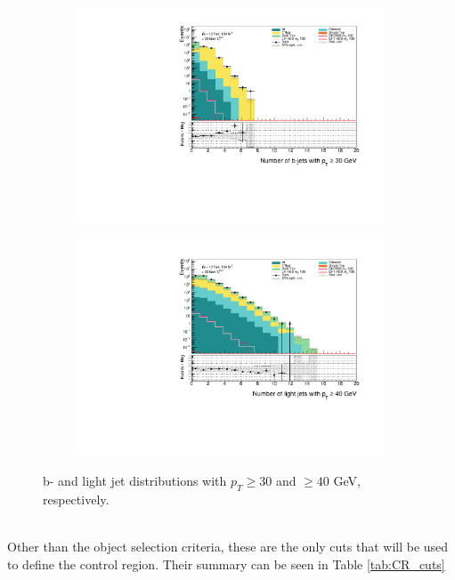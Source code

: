 \documentclass[14pt, a4paper]{book}
\begin{document}
\begin{figure}[!ht]
    \centering
    \hfill\begin{subfigure}[b]{0.49\textwidth}
        \centering
        \includegraphics[width=\textwidth]{bjetsPt30.pdf}
    \end{subfigure}
    \hfill\begin{subfigure}[b]{0.49\textwidth}
        \centering
        \includegraphics[width=\textwidth]{ljetsPt40.pdf}
    \end{subfigure}
    \caption[b- and light jet distributions in control region]{b- and light jet distributions with $p_T \ge30$ and $\ge40$ GeV, respectively.}\label{fig:jetcuts}
\end{figure}
\\Other than the object selection criteria, these are the only cuts that will be used to define the control region. Their summary can be seen in Table \ref{tab:CR_cuts}
\end{document}
